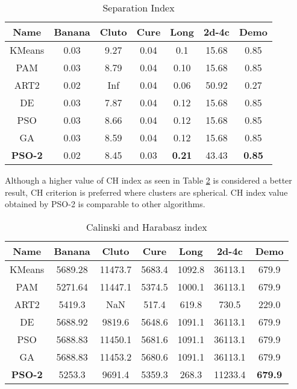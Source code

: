 \documentclass[conference]{IEEEtran}
\begin{document}
\begin{table}[H]
\caption{Separation Index}
\label{si}
\centering
\begin{tabular}{||c|c|c|c|c|c|c||}
  \hline
\multicolumn{1}{|c|}{\textbf{Name}} & \multicolumn{1}{c|}{\textbf{Banana}} & \multicolumn{1}{c|}{\textbf{Cluto}} & \multicolumn{1}{c|}{\textbf{Cure}} & \multicolumn{1}{c|}{\textbf{Long}} & \multicolumn{1}{c|}{\textbf{2d-4c}} & \multicolumn{1}{c|}{\textbf{Demo}}\\
  \hline\hline
  KMeans & 0.03 & 9.27 & 0.04 & 0.1 & 15.68 & 0.85 \\ [0.5ex]
   \hline
  PAM & 0.03 & 8.79 & 0.04 & 0.10 & 15.68 & 0.85 \\
   \hline
  ART2 & 0.02  & Inf & 0.04 & 0.06 & 50.92 & 0.27 \\
   \hline
  DE & 0.03 & 7.87 & 0.04 & 0.12 & 15.68 & 0.85 \\
   \hline
  PSO & 0.03 & 8.66 & 0.04 & 0.12 & 15.68 & 0.85 \\
   \hline
  GA & 0.03 & 8.59 & 0.04 & 0.12 & 15.68 & 0.85 \\
   \hline
  \textbf{PSO-2} & 0.02 & 8.45 &  0.03 & \textbf{0.21} & 43.43 &  \textbf{0.85}\\  [1ex]
  \hline
\end{tabular}
\end{table}

Although a higher value of CH index as seen in Table \ref{chin} is considered a better result, CH criterion is preferred where clusters are spherical. CH index value obtained by PSO-2 is comparable to other algorithms.

\begin{table}[H]
\caption{Calinski and Harabasz index}
\label{chin}
\centering
\begin{tabular}{||c|c|c|c|c|c|c||}
  \hline
\multicolumn{1}{|c|}{\textbf{Name}} & \multicolumn{1}{c|}{\textbf{Banana}} & \multicolumn{1}{c|}{\textbf{Cluto}} & \multicolumn{1}{c|}{\textbf{Cure}} & \multicolumn{1}{c|}{\textbf{Long}} & \multicolumn{1}{c|}{\textbf{2d-4c}} & \multicolumn{1}{c|}{\textbf{Demo}}\\
  \hline\hline
  KMeans & 5689.28 & 11473.7 & 5683.4 & 1092.8 & 36113.1 & 679.9 \\ [0.5ex]
   \hline
  PAM & 5271.64 & 11447.1 & 5374.5 & 1000.1 & 36113.1 & 679.9 \\
   \hline
  ART2 & 5419.3 & NaN & 517.4 & 619.8 & 730.5 & 229.0 \\
   \hline
  DE & 5688.92 & 9819.6 & 5648.6 & 1091.1 & 36113.1 & 679.9 \\
   \hline
  PSO & 5688.83 & 11450.1 & 5681.6 & 1091.1 & 36113.1 & 679.9 \\
   \hline
  GA & 5688.83 & 11453.2 & 5680.6 & 1091.1 & 36113.1 & 679.9 \\
   \hline
  \textbf{PSO-2} & 5253.3 &  9691.4 & 5359.3 & 268.3 & 11233.4  &  \textbf{679.9}\\  [1ex]
  \hline
\end{tabular}
\end{table}
\end{document}
